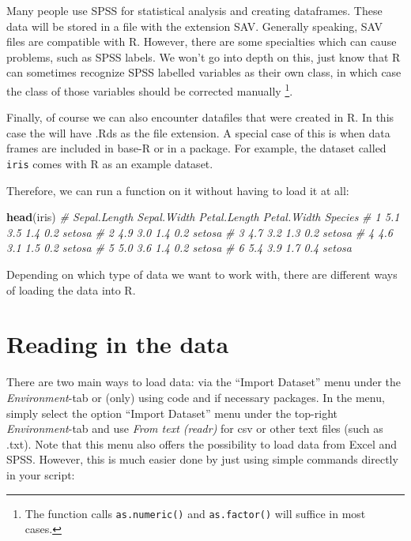 \documentclass[
]{book}
\newenvironment{Shaded}{\begin{snugshade}}{\end{snugshade}}
\newcommand{\CommentTok}[1]{\textcolor[rgb]{0.56,0.35,0.01}{\textit{#1}}}
\newcommand{\FunctionTok}[1]{\textcolor[rgb]{0.13,0.29,0.53}{\textbf{#1}}}
\newcommand{\NormalTok}[1]{#1}
\begin{document}
Many people use SPSS for statistical analysis and creating dataframes.
These data will be stored in a file with the extension SAV.
Generally speaking, SAV files are compatible with R.
However, there are some specialties which can cause problems, such as SPSS labels.
We won't go into depth on this, just know that R can sometimes recognize SPSS labelled variables as their own class, in which case the class of those variables should be corrected manually \footnote{The function calls \texttt{as.numeric()} and \texttt{as.factor()} will suffice in most cases.}.

Finally, of course we can also encounter datafiles that were created in R.
In this case the will have .Rds as the file extension.
A special case of this is when data frames are included in base-R or in a package.
For example, the dataset called \texttt{iris} comes with R as an example dataset.

Therefore, we can run a function on it without having to load it at all:

\begin{Shaded}
\begin{Highlighting}[]
\FunctionTok{head}\NormalTok{(iris)}
\CommentTok{\#   Sepal.Length Sepal.Width Petal.Length Petal.Width Species}
\CommentTok{\# 1          5.1         3.5          1.4         0.2  setosa}
\CommentTok{\# 2          4.9         3.0          1.4         0.2  setosa}
\CommentTok{\# 3          4.7         3.2          1.3         0.2  setosa}
\CommentTok{\# 4          4.6         3.1          1.5         0.2  setosa}
\CommentTok{\# 5          5.0         3.6          1.4         0.2  setosa}
\CommentTok{\# 6          5.4         3.9          1.7         0.4  setosa}
\end{Highlighting}
\end{Shaded}

Depending on which type of data we want to work with, there are different ways of loading the data into R.

\section{Reading in the data}\label{reading-in-the-data}

There are two main ways to load data: via the ``Import Dataset'' menu under the \emph{Environment}-tab or (only) using code and if necessary packages.
In the menu, simply select the option ``Import Dataset'' menu under the top-right \emph{Environment}-tab and use \emph{From text (readr)} for csv or other text files (such as .txt).
Note that this menu also offers the possibility to load data from Excel and SPSS.
However, this is much easier done by just using simple commands directly in your script:
\end{document}
